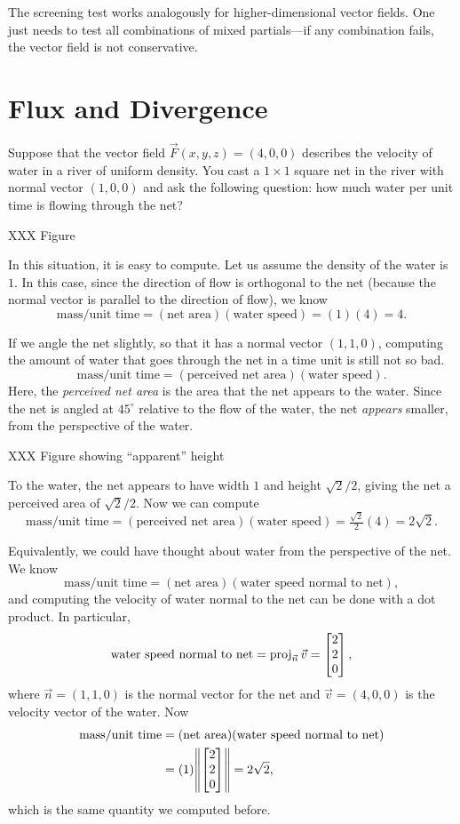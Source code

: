 The screening test works analogously for higher-dimensional vector fields.  One just
needs to test all combinations of mixed partials---if any combination fails, the vector
field is not conservative.

\begin{exercises}
\end{exercises}


\section{Flux and Divergence}

Suppose that the vector field $\vec F(x,y,z)=(4,0,0)$
describes the velocity of water in a river of uniform density.
You cast a $1\times 1$ square net in the river with normal
vector $(1,0,0)$ and ask the following question: how much 
water per unit time is flowing through the net?

XXX Figure

In this situation, it is easy to compute.  Let us assume
the density of the water is $1$.  In this case, since the direction
of flow is orthogonal to the net (because the normal vector is parallel
to the direction of flow), we know
\[
	\text{mass}/\text{unit time} = (\text{net area})
	(\text{water speed})=(1)(4)=4.
\]

If we angle the net slightly, so that it has a normal vector
$(1,1,0)$, computing the amount of water that goes through
the net in a time unit is still not so bad.
\[
	\text{mass}/\text{unit time} = (\text{perceived net area})
	(\text{water speed}).
\]
Here, the \emph{perceived net area} is the area that the net appears to
the water.  Since the net is angled at $45^\circ$ relative to the flow
of the water, the net \emph{appears} smaller, from the perspective of the water.

XXX Figure showing ``apparent'' height

To the water, the net appears to have width $1$ and height $\sqrt{2}/2$, giving
the net a perceived area of $\sqrt{2}/2$.  Now we can compute
\[
	\text{mass}/\text{unit time} = (\text{perceived net area})
	(\text{water speed}) =\tfrac{\sqrt 2}{2}(4)=2\sqrt{2}.
\]

Equivalently, we could have thought about water from the perspective of the net.
We know
\[
	\text{mass}/\text{unit time} = (\text{net area})
	(\text{water speed normal to net}),
\]
and computing the velocity of water normal to the net can be done with a dot product.
In particular,
\[
	\text{water speed normal to net}=\Proj_{\vec n}\vec v = \mat{2\\2\\0},
\]
where $\vec n=(1,1,0)$ is the normal vector for the net and $\vec v=(4,0,0)$
is the velocity vector of the water.  Now
\begin{align*}
	\text{mass}/\text{unit time} &= (\text{net area})
	(\text{water speed normal to net}) \\
	&= (1)\norm*{\mat{2\\2\\0}}=2\sqrt{2},
\end{align*}
which is the same quantity we computed before.

